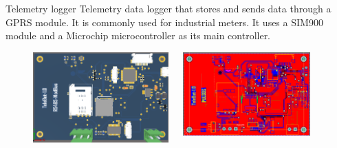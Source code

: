 \documentclass[aspectratio=169]{beamer}
\begin{document}
\begin{frame}{Telemetry logger}
  Telemetry data logger that stores and sends data through a GPRS module.
  It is commonly used for industrial meters. It uses a SIM900 module and a
  Microchip microcontroller as its main controller.
  \begin{figure}[H]
    \centering
    \begin{columns}[T]
      \begin{column}{.3\linewidth}
        \includegraphics[width=\linewidth]{images/telebot1}
      \end{column}
      \begin{column}{.3\linewidth}
        \includegraphics[width=\linewidth]{images/telebot2}
      \end{column}
      \begin{column}{.3\linewidth}

\end{column}
\end{columns}
\end{figure}
\end{frame}
\end{document}
